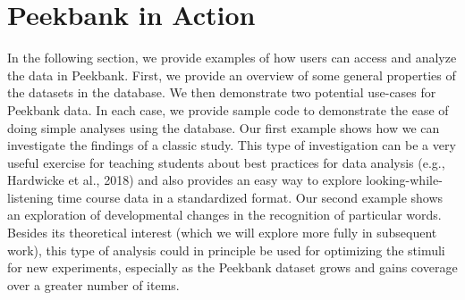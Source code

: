 \documentclass[
  english,
  man,floatsintext]{apa6}
\begin{document}
\hypertarget{peekbank-in-action}{%
\section{Peekbank in Action}\label{peekbank-in-action}}

In the following section, we provide examples of how users can access and analyze the data in Peekbank.
First, we provide an overview of some general properties of the datasets in the database.
We then demonstrate two potential use-cases for Peekbank data.
In each case, we provide sample code to demonstrate the ease of doing simple analyses using the database.
Our first example shows how we can investigate the findings of a classic study.
This type of investigation can be a very useful exercise for teaching students about best practices for data analysis (e.g., Hardwicke et al., 2018) and also provides an easy way to explore looking-while-listening time course data in a standardized format.
Our second example shows an exploration of developmental changes in the recognition of particular words.
Besides its theoretical interest (which we will explore more fully in subsequent work), this type of analysis could in principle be used for optimizing the stimuli for new experiments, especially as the Peekbank dataset grows and gains coverage over a greater number of items.
\end{document}
